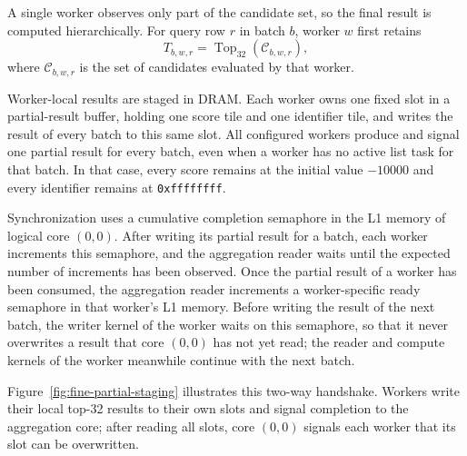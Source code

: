 A single worker observes only part of the candidate set, so the final result is computed hierarchically. For query row \(r\) in batch \(b\), worker \(w\) first retains
\begin{equation}
T_{b,w,r}=\operatorname{Top}_{32}\left(\mathcal{C}_{b,w,r}\right),
\label{eq:worker-top32}
\end{equation}
where \(\mathcal{C}_{b,w,r}\) is the set of candidates evaluated by that worker.

Worker-local results are staged in DRAM. Each worker owns one fixed slot in a partial-result buffer, holding one score tile and one identifier tile, and writes the result of every batch to this same slot. All configured workers produce and signal one partial result for every batch, even when a worker has no active list task for that batch. In that case, every score remains at the initial value \(-10000\) and every identifier remains at \texttt{0xffffffff}.

Synchronization uses a cumulative completion semaphore in the L1 memory of logical core \((0,0)\). After writing its partial result for a batch, each worker increments this semaphore, and the aggregation reader waits until the expected number of increments has been observed. Once the partial result of a worker has been consumed, the aggregation reader increments a worker-specific ready semaphore in that worker's L1 memory. Before writing the result of the next batch, the writer kernel of the worker waits on this semaphore, so that it never overwrites a result that core \((0,0)\) has not yet read; the reader and compute kernels of the worker meanwhile continue with the next batch.

Figure~\ref{fig:fine-partial-staging} illustrates this two-way handshake. Workers write their local top-32 results to their own slots and signal completion to the aggregation core; after reading all slots, core \((0,0)\) signals each worker that its slot can be overwritten.

